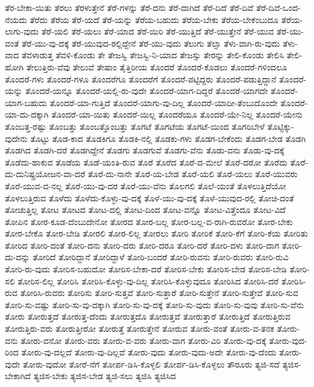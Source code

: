 {ತೆರ-ಬೇಕಾ-ಯಿತು
ತೆರಲು
ತೆರಳುತ್ತೇನೆ
ತೆರೆ-ಗಳನ್ನು
ತೆರೆ-ದನು
ತೆರೆ-ದಾಗಿದೆ
ತೆರೆ-ದಿದೆ
ತೆರೆ-ದಿವೆ
ತೆರೆ-ದಿವೆ-ಒಂದ-ನೆಯದು
ತೆರೆದು
ತೆರೆಯ
ತೆರೆ-ಯದೆ
ತೆರೆ-ಯನ್ನು
ತೆರೆಯ-ಬಹುದು
ತೆರೆಯ-ಬೇಕು
ತೆರೆಯ-ಬೇಕೆಂಬುದೂ
ತೆರೆಯ-ಲಾಗು-ವುದು
ತೆರೆ-ಯಲಿ
ತೆರೆ-ಯಲು
ತೆರೆ-ಯಾದ
ತೆರೆ-ಯಿರಿ
ತೆರೆ-ಯುತ್ತಿದೆ
ತೆರೆ-ಯುತ್ತೇನೆ
ತೆರೆ-ಯುವ
ತೆರೆ-ಯು-ವಂತೆ
ತೆರೆ-ಯು-ವು-ದಕ್ಕೆ
ತೆರೆ-ಯುವುದ-ರಲ್ಲಿದ್ದೇನೆ
ತೆರೆ-ಯು-ವುದು
ತೆಲುಗು
ತೆಲ್ಸಾ
ತೆಳು-ವಾಗಿ-ರು-ವುದು
ತೆಳು-ವಾದ
ತೆವಳಾಡುತ್ತ
ತೆವಳಿ-ಕೊಂಡು
ತೇ
ತೇಜಸ್ವಿ
ತೇಜಸ್ವಿ-ನಿ-ಯಾದ
ತೇಜಸ್ಸು
ತೇರನ್ನು
ತೇಲಿ-ಕೊಂಡು
ತೇಲಿಸಿ
ತೇಲಿ-ಹೋಗಿ
ತೇಲುತ್ತಿರು-ವೆವು
ತೇಲುವೆ
ತೇಷಾಂ
ತೈತ್ತಿರೀಯ
ತೊಂದರೆ
ತೊಂದರೆ-ಕೊಡಲು
ತೊಂದರೆ-ಗಳಿಂದಲೂ
ತೊಂದರೆ-ಗಳು
ತೊಂದರೆ-ಗಳೂ
ತೊಂದರೆಗೂ
ತೊಂದರೆಗೆ
ತೊಂದರೆ-ಪಟ್ಟಿದ್ದರು
ತೊಂದರೆ-ಪಡುತ್ತಿದ್ದಾನೆ
ತೊಂದರೆ-ಯನ್ನು
ತೊಂದರೆ-ಯನ್ನೂ
ತೊಂದರೆ-ಯಲ್ಲಿ-ರು-ವುದೇ
ತೊಂದರೆ-ಯಾಗ-ದಿದ್ದರೆ
ತೊಂದರೆ-ಯಾಗದೇ
ತೊಂದರೆ-ಯಾಗ-ಬಹುದು
ತೊಂದರೆ-ಯಾ-ಗುತ್ತಿದೆ
ತೊಂದರೆ-ಯಾಗು-ವು-ದಿಲ್ಲ
ತೊಂದರೆ-ಯಾದೀ-ತೆಂಬುದೊಂದೇ
ತೊಂದರೆ-ಯಾ-ದು-ದಕ್ಕಾಗಿ
ತೊಂದರೆ-ಯಾ-ಯಿತು
ತೊಂದರೆ-ಯಿಲ್ಲ
ತೊಂದರೆಯೂ
ತೊಂದರೆ-ಯೇ-ನಿಲ್ಲ
ತೊಂದರೆ-ಯೇನು
ತೊಂಬತ್ತ-ರಷ್ಟು
ತೊಂಬತ್ತು
ತೊಂಬತ್ತೊಂಬತ್ತು
ತೊಗಟೆ
ತೊಗಟೆಯ
ತೊಗಟೆ-ಯಿಂದ
ತೊಗರಿಬೇಳೆ
ತೊಟ್ಟಿಕ್ಕು-ವುದೇನು
ತೊಟ್ಟು
ತೊಡ-ಕಾದ
ತೊಡಕಿಗೂ
ತೊಡಕಿ-ನಲ್ಲಿ
ತೊಡಕು-ಗಳು
ತೊಡಗ-ಬೇಕೆಂದು
ತೊಡಗ-ಬೇಡ
ತೊಡಗಿ
ತೊಡಗಿದ
ತೊಡಗಿ-ದರೆ
ತೊಡಗಿದ್ದೇನೆ
ತೊಡಗು
ತೊಡಗುವೆ
ತೊಡಗು-ವೆನು
ತೊಡು-ವನು
ತೊಡು-ವು-ದಕ್ಕೆ
ತೊಡೆದು-ಹಾಕುವ
ತೊಡೆಯ
ತೊಡೆ-ಯಂತಿ-ರುವ
ತೊರೆ
ತೊರೆದ
ತೊರೆ-ದ-ಮೇಲೆ
ತೊರೆ-ದರೋ
ತೊರೆದು
ತೊರೆ-ದು-ದುನಿಷ್ಪ್ರಯೋಜನ-ವಾ-ದರೆ
ತೊರೆ-ದು-ನಾನೇ
ತೊರೆ-ಯ-ಬೇಡ
ತೊರೆ-ಯಲಿ
ತೊರೆ-ಯಲು
ತೊರೆ-ಯುವರು
ತೊರೆ-ಯುವ-ವ-ನಲ್ಲ
ತೊರೆ-ಯು-ವು-ದರ
ತೊರೆ-ಯು-ವೆನು
ತೊಲಗಲಿ
ತೊಲೆ-ಯಂತೆ
ತೊಳಲುತ್ತಿದೆಯೋ
ತೊಳಲುತ್ತಿರುವ
ತೊಳೆದು
ತೊಳೆದು-ಕೊಳ್ಳು-ವು-ದಕ್ಕೆ
ತೊಳೆ-ಯು-ವು-ದಕ್ಕೆ
ತೊಳೆ-ಯುವುದ-ರಲ್ಲಿ
ತೋಚಿ-ದಂತೆ
ತೋಚುತ್ತಿಲ್ಲ
ತೋಟ
ತೋಟದ
ತೋಟ-ದಲ್ಲಿ
ತೋಟ-ದಿಂದ
ತೋಟ-ವನ್ನೊ
ತೋಟ-ವಿತ್ತೆಂದೂ
ತೋಟ-ವಿದೆ
ತೋಪಿನ
ತೋರ-ಕೂಡ-ದೆಂಬುದೇನೋ
ತೋರದ
ತೋರ-ಬಲ್ಲ
ತೋರ-ಬಲ್ಲ-ವ-ರಾಗಿ-ರುವರೋ
ತೋರ-ಬೇಕು
ತೋರ-ಬೇಕೊ
ತೋರ-ಬೇಡಿ
ತೋರಲಿ
ತೋರ-ಲಿಲ್ಲ
ತೋರಲು
ತೋರಿ
ತೋರಿಕೆ
ತೋರಿ-ಕೆಗೆ
ತೋರಿ-ಕೆಯ
ತೋರಿತು
ತೋರಿದ
ತೋರಿ-ದಂತೆ
ತೋರಿ-ದನು
ತೋರಿ-ದರು
ತೋರಿ-ದರೂ
ತೋರಿ-ದರೆ
ತೋರಿ-ದಳು
ತೋರಿ-ದಾಗ
ತೋರಿ-ದು-ದನ್ನು
ತೋರಿದೆ
ತೋರಿದ್ದಾನೆ
ತೋರಿದ್ದಾಳೆ
ತೋರಿ-ಬಂದರೆ
ತೋರಿ-ರುವನು
ತೋರಿ-ರುವರು
ತೋರಿ-ರುವಿ
ತೋರಿ-ರು-ವುದು
ತೋರಿಸ-ಬಹುದೋ
ತೋರಿಸ-ಬೇಕಾ-ದರೆ
ತೋರಿಸ-ಬೇಕು
ತೋರಿಸ-ಬೇಡ
ತೋರಿಸ-ಬೇಡಿ
ತೋರಿ-ಸಲಿ
ತೋರಿಸ-ಲಿಲ್ಲ
ತೋರಿಸಿ
ತೋರಿಸಿ-ಕೊಳ್ಳು-ವು-ದಿಲ್ಲ
ತೋರಿಸಿ-ಕೊಳ್ಳುವುದೂ
ತೋರಿಸಿದ
ತೋರಿಸಿ-ದರೆ
ತೋರಿಸಿ-ರುವ
ತೋರಿಸಿ-ರುವರು
ತೋರಿಸು
ತೋರಿ-ಸುತ್ತವೆ
ತೋರಿ-ಸುತ್ತಾರೆ
ತೋರಿ-ಸುತ್ತೇನೆ
ತೋರಿ-ಸುತ್ತೇವೆ
ತೋರಿ-ಸುವ
ತೋರಿ-ಸು-ವಷ್ಟು
ತೋರಿ-ಸು-ವು-ದಕ್ಕಾಗಿ
ತೋರಿ-ಸು-ವು-ದಕ್ಕೆ
ತೋರಿ-ಸು-ವುದು
ತೋರಿ-ಸು-ವುವು
ತೋರಿ-ಸು-ವೆನು
ತೋರು
ತೋರುತ್ತದೆ
ತೋರುತ್ತ-ದೆಂದು
ತೋರುತ್ತದೊ
ತೋರುತ್ತವೆ
ತೋರುತ್ತಾರೆ
ತೋರುತ್ತಿದೆ
ತೋರುತ್ತಿರುವ
ತೋರುತ್ತಿರು-ವರು
ತೋರುತ್ತೀರೋ
ತೋರುತ್ತೆ
ತೋರುತ್ತೇನೆ
ತೋರುವ
ತೋರು-ವಂತೆ
ತೋರು-ವ-ತನಕ
ತೋರು-ವನು
ತೋರು-ವನೋ
ತೋರು-ವರು
ತೋರು-ವ-ವರು
ತೋರು-ವಾಗ
ತೋರು-ವಿರಿ
ತೋರು-ವು-ದಕ್ಕೆ
ತೋರು-ವುದ-ರಿಂದ
ತೋರು-ವು-ದಲ್ಲದೆ
ತೋರು-ವು-ದಿಲ್ಲವೆ
ತೋರು-ವುದು
ತೋರು-ವುದು-ಅದೇ
ತೋರು-ವು-ದೆಂದು
ತೋರು-ವುದೇ
ತೋರು-ವುದೋ
ತೋರೆ-ನೆಗೆ
ತೋರ್ಪ-ಡಿಸಿ-ಕೊಳ್ಳಲಿ
ತೋರ್ಪ-ಡಿಸಿ-ಕೊಳ್ಳಲು
ತೌರೂರು
ತ್ಯಜಿ-ಸದೆ
ತ್ಯಜಿಸ-ಬೇಕಾಗಿದೆ
ತ್ಯಜಿಸ-ಬೇಕು
ತ್ಯಜಿಸ-ಬೇಡ
ತ್ಯಜಿ-ಸಲು
ತ್ಯಜಿಸಿ
ತ್ಯಜಿಸಿದ
}
